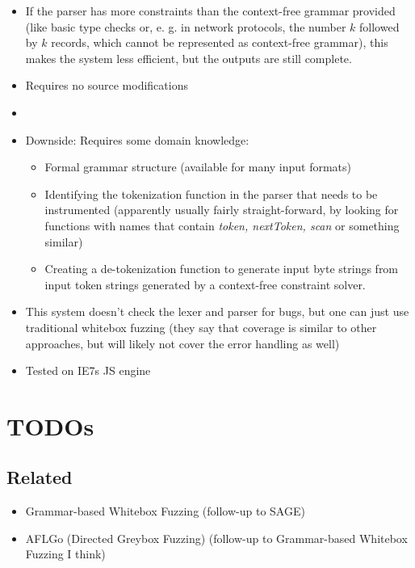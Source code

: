 \documentclass[12pt]{article}
\begin{document}
\begin{itemize}
    \item If the parser has more constraints than the context-free grammar provided (like basic type checks or, e. g. in network protocols, the number $k$ followed by $k$ records, which cannot be represented as context-free grammar), this makes the system less efficient, but the outputs are still complete.
    \item Requires no source modifications
    \item {}\cite{GrammarBasedWhiteboxFuzzing}
    \item Downside: Requires some domain knowledge:\begin{itemize}
              \item Formal grammar structure (available for many input formats)
              \item Identifying the tokenization function in the parser that needs to be instrumented (apparently usually fairly straight-forward, by looking for functions with names that contain \textit{token, nextToken, scan} or something similar)
              \item Creating a de-tokenization function to generate input byte strings from input token strings generated by a context-free constraint solver.
          \end{itemize}
    \item This system doesn't check the lexer and parser for bugs, but one can just use traditional whitebox fuzzing (they say that coverage is similar to other approaches, but will likely not cover the error handling as well)
    \item Tested on IE7s JS engine
\end{itemize}

\section{TODOs}
\subsection{Related}
\begin{itemize}
    \item Grammar-based Whitebox Fuzzing\cite{GrammarBasedWhiteboxFuzzing} (follow-up to SAGE\cite{SAGE})
    \item AFLGo (Directed Greybox Fuzzing)\cite{AFLGo} (follow-up to Grammar-based Whitebox Fuzzing I think)
\end{itemize}
\end{document}
